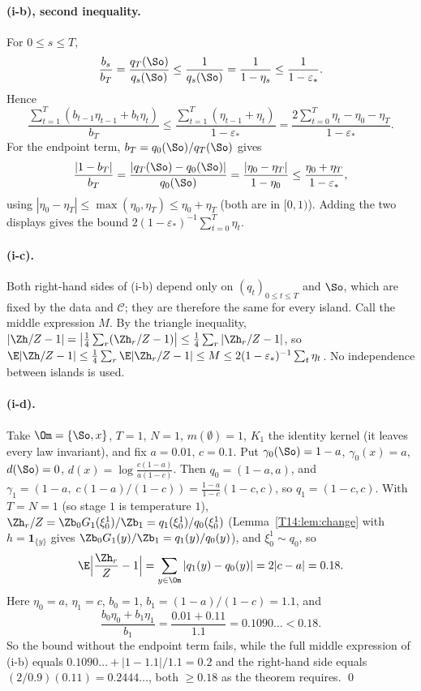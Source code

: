 \documentclass[11pt]{report}
\begin{document}
\paragraph{(i-b), second inequality.} For $0\le s\le T$,
\[
\frac{b_s}{b_T}=\frac{q_T(\So)}{q_s(\So)}\le\frac1{q_s(\So)}=\frac1{1-\eta_s}\le\frac1{1-\varepsilon_*}.
\]
Hence
\[
\frac{\sum_{t=1}^T(b_{t-1}\eta_{t-1}+b_t\eta_t)}{b_T}\le\frac{\sum_{t=1}^T(\eta_{t-1}+\eta_t)}{1-\varepsilon_*}
=\frac{2\sum_{t=0}^T\eta_t-\eta_0-\eta_T}{1-\varepsilon_*}.
\]
For the endpoint term, $b_T=q_0(\So)/q_T(\So)$ gives
\[
\frac{|1-b_T|}{b_T}=\frac{|q_T(\So)-q_0(\So)|}{q_0(\So)}=\frac{|\eta_0-\eta_T|}{1-\eta_0}
\le\frac{\eta_0+\eta_T}{1-\varepsilon_*},
\]
using $|\eta_0-\eta_T|\le\max(\eta_0,\eta_T)\le\eta_0+\eta_T$ (both are in $[0,1)$). Adding the two displays gives the
bound $2(1-\varepsilon_*)^{-1}\sum_{t=0}^T\eta_t$.

\paragraph{(i-c).} Both right-hand sides of (i-b) depend only on $(q_t)_{0\le t\le T}$ and $\So$, which are fixed by the
data and $\mathcal C$; they are therefore the same for every island. Call the middle expression $M$. By the triangle inequality,
$|\Zh/Z-1|=\bigl|\tfrac14\sum_r(\Zh_r/Z-1)\bigr|\le\tfrac14\sum_r|\Zh_r/Z-1|$, so
$\E|\Zh/Z-1|\le\tfrac14\sum_r\E|\Zh_r/Z-1|\le M\le 2(1-\varepsilon_*)^{-1}\sum_t\eta_t$. No independence between islands
is used.

\paragraph{(i-d).} Take $\Om=\{\So,x\}$, $T=1$, $N=1$, $m(\emptyset)=1$, $K_1$ the identity kernel (it leaves every law
invariant), and fix $a=0.01$, $c=0.1$. Put $\gamma_0(\So)=1-a$, $\gamma_0(x)=a$, $d(\So)=0$,
$d(x)=\log\frac{c(1-a)}{a(1-c)}$. Then $q_0=(1-a,a)$, and $\gamma_1=(1-a,\;c(1-a)/(1-c))=\frac{1-a}{1-c}(1-c,c)$, so
$q_1=(1-c,c)$. With $T=N=1$ (so stage $1$ is temperature $1$), $\Zh_r/Z=\Zb_0G_1(\xi_0^1)/\Zb_1=q_1(\xi_0^1)/q_0(\xi_0^1)$ (Lemma~\ref{T14:lem:change} with
$h=\mathbf 1_{\{y\}}$ gives $\Zb_0 G_1(y)/\Zb_1=q_1(y)/q_0(y)$), and $\xi_0^1\sim q_0$, so
\[
\E\Bigl|\frac{\Zh_r}{Z}-1\Bigr|=\sum_{y\in\Om}|q_1(y)-q_0(y)|=2|c-a|=0.18 .
\]
Here $\eta_0=a$, $\eta_1=c$, $b_0=1$, $b_1=(1-a)/(1-c)=1.1$, and
\[
\frac{b_0\eta_0+b_1\eta_1}{b_1}=\frac{0.01+0.11}{1.1}=0.1090\ldots<0.18 .
\]
So the bound without the endpoint term fails, while the full middle expression of (i-b) equals
$0.1090\ldots+|1-1.1|/1.1=0.2$ and the right-hand side equals $(2/0.9)(0.11)=0.2444\ldots$, both $\ge0.18$ as the theorem
requires. \qed
\end{document}
